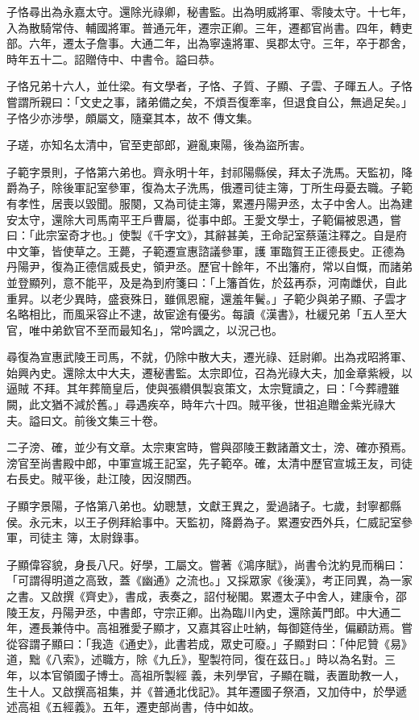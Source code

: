 \begin{pinyinscope}
 子恪尋出為永嘉太守。還除光祿卿，秘書監。出為明威將軍、零陵太守。十七年，入為散騎常侍、輔國將軍。普通元年，遷宗正卿。三年，遷都官尚書。四年，轉吏部。六年，遷太子詹事。大通二年，出為寧遠將軍、吳郡太守。三年，卒于郡舍，時年五十二。詔贈侍中、中書令。謚曰恭。



 子恪兄弟十六人，並仕梁。有文學者，子恪、子質、子顯、子雲、子暉五人。子恪嘗謂所親曰：「文史之事，諸弟備之矣，不煩吾復牽率，但退食自公，無過足矣。」子恪少亦涉學，頗屬文，隨棄其本，故不
 傳文集。



 子瑳，亦知名太清中，官至吏部郎，避亂東陽，後為盜所害。



 子範字景則，子恪第六弟也。齊永明十年，封祁陽縣侯，拜太子洗馬。天監初，降爵為子，除後軍記室參軍，復為太子洗馬，俄遷司徒主簿，丁所生母憂去職。子範有孝性，居喪以毀聞。服闋，又為司徒主簿，累遷丹陽尹丞，太子中舍人。出為建安太守，還除大司馬南平王戶曹屬，從事中郎。王愛文學士，子範偏被恩遇，嘗曰：「此宗室奇才也。」使製《千字文》，其辭甚美，王命記室蔡薳注釋之。自是府中文筆，皆使草之。王薨，子範遷宣惠諮議參軍，護
 軍臨賀王正德長史。正德為丹陽尹，復為正德信威長史，領尹丞。歷官十餘年，不出籓府，常以自慨，而諸弟並登顯列，意不能平，及是為到府箋曰：「上籓首佐，於茲再忝，河南雌伏，自此重昇。以老少異時，盛衰殊日，雖佩恩寵，還羞年鬢。」子範少與弟子顯、子雲才名略相比，而風采容止不逮，故宦途有優劣。每讀《漢書》，杜緩兄弟「五人至大官，唯中弟欽官不至而最知名」，常吟諷之，以況己也。



 尋復為宣惠武陵王司馬，不就，仍除中散大夫，遷光祿、廷尉卿。出為戎昭將軍、始興內史。還除太中大夫，遷秘書監。太宗即位，召為光祿大夫，加金章紫綬，以逼賊
 不拜。其年葬簡皇后，使與張纘俱製哀策文，太宗覽讀之，曰：「今葬禮雖闕，此文猶不減於舊。」尋遇疾卒，時年六十四。賊平後，世祖追贈金紫光祿大夫。謚曰文。前後文集三十卷。



 二子滂、確，並少有文章。太宗東宮時，嘗與邵陵王數諸蕭文士，滂、確亦預焉。滂官至尚書殿中郎，中軍宣城王記室，先子範卒。確，太清中歷官宣城王友，司徒右長史。賊平後，赴江陵，因沒關西。



 子顯字景陽，子恪第八弟也。幼聰慧，文獻王異之，愛過諸子。七歲，封寧都縣侯。永元末，以王子例拜給事中。天監初，降爵為子。累遷安西外兵，仁威記室參軍，司徒主
 簿，太尉錄事。



 子顯偉容貌，身長八尺。好學，工屬文。嘗著《鴻序賦》，尚書令沈約見而稱曰：「可謂得明道之高致，蓋《幽通》之流也。」又採眾家《後漢》，考正同異，為一家之書。又啟撰《齊史》，書成，表奏之，詔付秘閣。累遷太子中舍人，建康令，邵陵王友，丹陽尹丞，中書郎，守宗正卿。出為臨川內史，還除黃門郎。中大通二年，遷長兼侍中。高祖雅愛子顯才，又嘉其容止吐納，每御筵侍坐，偏顧訪焉。嘗從容謂子顯曰：「我造《通史》，此書若成，眾史可廢。」子顯對曰：「仲尼贊《易》道，黜《八索》，述職方，除《九丘》，聖製符同，復在茲日。」時以為名對。三年，以本官領國子博士。高祖所製經
 義，未列學官，子顯在職，表置助教一人，生十人。又啟撰高祖集，并《普通北伐記》。其年遷國子祭酒，又加侍中，於學遞述高祖《五經義》。五年，遷吏部尚書，侍中如故。




\end{pinyinscope}
